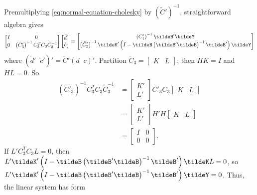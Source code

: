 Premultiplying \ref{eq:normal-equation-cholesky} by $\left(\tilde{C}'\right)^{-1}$, straightforward algebra gives 
\begin{equation} \label{eq:vectorized-normal-equations-cholesky}
\begin{bmatrix}
I & 0 \\
0 & \left(\tilde{C}'_3\right)^{-1} C_3^{T} C_3 \tilde{C}_3^{-1}\\
\end{bmatrix}
\begin{bmatrix}
\tilde{d}\\
\tilde{c}\\
\end{bmatrix}
= \begin{bmatrix}
\left(C'_1\right)^{-1} \tildeB'\tildeY \\
\left(\tilde{C}'_3\right)^{-1} \tildeK'\left( I - \tildeB\left( \tildeB' \tildeB \right)^{-1} \tildeB' \right) \tildeY\\
\end{bmatrix}
\end{equation}
\noindent
where $\left( \tilde{d}'\;\;\tilde{c}' \right)' =  \tilde{C}' \left( d\;\;c \right)'$. Partition $\tilde{C}_3 = \begin{bmatrix} K &  L\end{bmatrix}$; then $HK = I$ and $HL = 0$. So
\begin{align*}
\left(\tilde{C}'_3\right)^{-1} C_3^{T} C_3 \tilde{C}_3^{-1} &= \begin{bmatrix} K' \\ L' \end{bmatrix} C'_3C_3 \begin{bmatrix} K &  L\end{bmatrix} \\
&= \begin{bmatrix} K' \\ L' \end{bmatrix} H'H \begin{bmatrix} K &  L\end{bmatrix} \\
&= \begin{bmatrix} I & 0 \\ 0 & 0 \end{bmatrix}.
\end{align*}
\noindent
If $L'C_3^{T} C_3 L = 0$, then $L'\tildeK'\left( I - \tildeB\left( \tildeB' \tildeB \right)^{-1} \tildeB' \right)\tildeK L = 0$, so $L'\tildeK'\left( I - \tildeB\left( \tildeB' \tildeB \right)^{-1} \tildeB' \right) \tildeY = 0$. Thus, the linear system has form
